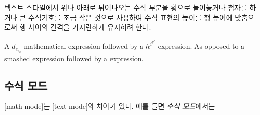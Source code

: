 텍스트 스타일에서 위나 아래로 튀어나오는 수식 부분을 횡으로 늘어놓거나 첨자를 하거나
큰 수식기호를 조금 작은 것으로 사용하여
수식 표현의 높이를 행 높이에 맞춤으로써 행 사이의 간격을 가지런하게 
유지하려 한다.
\begin{example}
A $d_{e_{e_p}}$ mathematical
expression  followed by a
$h^{i^{g^h}}$ expression. As
opposed to a smashed 
 expression 
followed by a
 expression.
\end{example}

\subsection{수식 모드}

[math mode]는 [text mode]와 차이가 있다. 예를 들면 \emph{수식 모드}에서는

